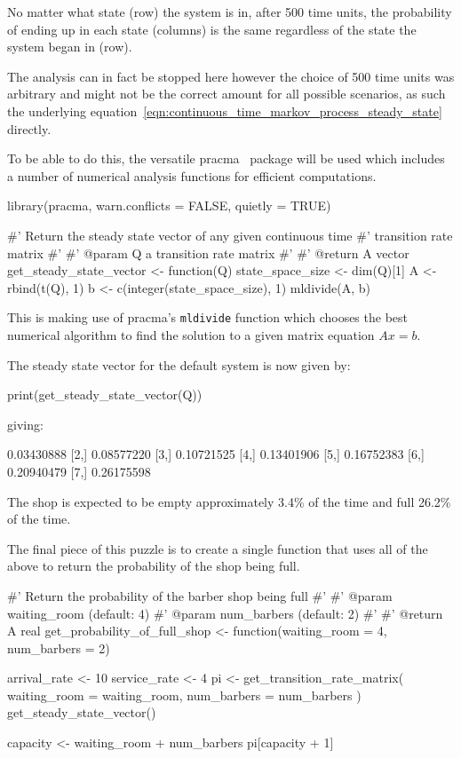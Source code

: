 No matter what state (row) the system is in,
after 500 time units, the probability of ending up in each state (columns) is
the same regardless of the state the system began in (row).

The analysis can in fact be stopped here
however the choice of 500 time units was arbitrary and might not be the correct
amount for all possible scenarios, as such the
underlying equation~\ref{eqn:continuous_time_markov_process_steady_state}
directly.

To be able to do this, the versatile pracma~\cite{borchers2021pracma} package
will be used which includes a number of numerical analysis functions for
efficient computations.

\begin{Rin}
library(pracma, warn.conflicts = FALSE, quietly = TRUE)

#' Return the steady state vector of any given continuous time
#' transition rate matrix
#'
#' @param Q a transition rate matrix
#'
#' @return A vector
get_steady_state_vector <- function(Q){
  state_space_size <- dim(Q)[1]
  A <- rbind(t(Q), 1)
  b <- c(integer(state_space_size), 1)
  mldivide(A, b)
}
\end{Rin}

This is making use of pracma's \texttt{mldivide} function
which chooses the best numerical algorithm to find the solution to a given
matrix equation \(Ax=b\).

The steady state vector for the default system is now given by:

\begin{Rin}
print(get_steady_state_vector(Q))
\end{Rin}

giving:

\begin{Rout}
           [,1]
[1,] 0.03430888
[2,] 0.08577220
[3,] 0.10721525
[4,] 0.13401906
[5,] 0.16752383
[6,] 0.20940479
[7,] 0.26175598
\end{Rout}

The shop is expected to be empty approximately 3.4\% of the time
and full 26.2\% of the time.

The final piece of this puzzle is to create a single function that uses all of
the above to return the probability of the shop being full.

\begin{Rin}
#' Return the probability of the barber shop being full
#'
#' @param waiting_room (default: 4)
#' @param num_barbers (default: 2)
#'
#' @return A real
get_probability_of_full_shop <- function(waiting_room = 4,
                                         num_barbers = 2){
  arrival_rate <- 10
  service_rate <- 4
  pi <- get_transition_rate_matrix(
    waiting_room = waiting_room,
    num_barbers = num_barbers
    ) %
    get_steady_state_vector()

  capacity <- waiting_room + num_barbers
  pi[capacity + 1]
}
\end{Rin}


